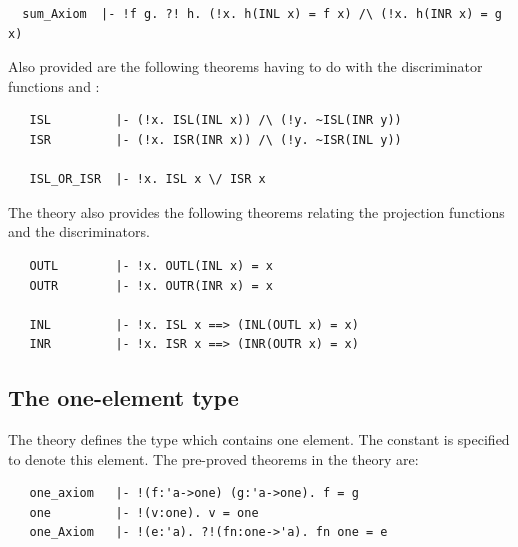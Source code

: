 \begin{hol}
\begin{verbatim}
  sum_Axiom  |- !f g. ?! h. (!x. h(INL x) = f x) /\ (!x. h(INR x) = g x)
\end{verbatim}
\end{hol}

\noindent Also provided are the following theorems having to
do with the discriminator functions  and :

\begin{hol}
\begin{verbatim}
   ISL         |- (!x. ISL(INL x)) /\ (!y. ~ISL(INR y))
   ISR         |- (!x. ISR(INR x)) /\ (!y. ~ISR(INL y))

   ISL_OR_ISR  |- !x. ISL x \/ ISR x
\end{verbatim}
\end{hol}

\noindent The  theory also provides the following theorems
relating the projection functions and the discriminators.

\begin{hol}
\begin{verbatim}
   OUTL        |- !x. OUTL(INL x) = x
   OUTR        |- !x. OUTR(INR x) = x

   INL         |- !x. ISL x ==> (INL(OUTL x) = x)
   INR         |- !x. ISR x ==> (INR(OUTR x) = x)
\end{verbatim}
\end{hol}



\subsection{The one-element type}%
%

The theory  defines  the type   which  contains one element.
The constant    is specified  to denote  this element.   The pre-proved
theorems in the theory  are:

\begin{hol}
\begin{verbatim}
   one_axiom   |- !(f:'a->one) (g:'a->one). f = g
   one         |- !(v:one). v = one
   one_Axiom   |- !(e:'a). ?!(fn:one->'a). fn one = e
\end{verbatim}
\end{hol}

